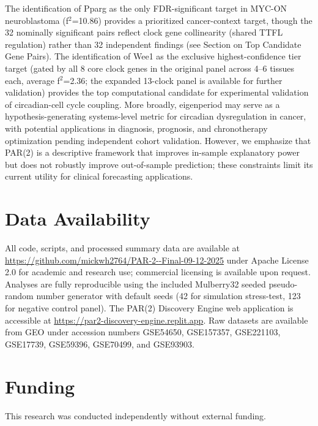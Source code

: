 \documentclass[11pt,a4paper]{article}
\begin{document}
The identification of Pparg as the only FDR-significant target in MYC-ON neuroblastoma (f$^2$=10.86) provides a prioritized cancer-context target, though the 32 nominally significant pairs reflect clock gene collinearity (shared TTFL regulation) rather than 32 independent findings (see Section on Top Candidate Gene Pairs). The identification of Wee1 as the exclusive highest-confidence tier target (gated by all 8 core clock genes in the original panel across 4--6 tissues each, average f$^2$=2.36; the expanded 13-clock panel is available for further validation) provides the top computational candidate for experimental validation of circadian-cell cycle coupling. More broadly, eigenperiod may serve as a hypothesis-generating systems-level metric for circadian dysregulation in cancer, with potential applications in diagnosis, prognosis, and chronotherapy optimization pending independent cohort validation. However, we emphasize that PAR(2) is a descriptive framework that improves in-sample explanatory power but does not robustly improve out-of-sample prediction; these constraints limit its current utility for clinical forecasting applications.

\section*{Data Availability}

All code, scripts, and processed summary data are available at \url{https://github.com/mickwh2764/PAR-2--Final-09-12-2025} under Apache License 2.0 for academic and research use; commercial licensing is available upon request. Analyses are fully reproducible using the included Mulberry32 seeded pseudo-random number generator with default seeds (42 for simulation stress-test, 123 for negative control panel). The PAR(2) Discovery Engine web application is accessible at \url{https://par2-discovery-engine.replit.app}. Raw datasets are available from GEO under accession numbers GSE54650, GSE157357, GSE221103, GSE17739, GSE59396, GSE70499, and GSE93903.

\section*{Funding}

This research was conducted independently without external funding.
\end{document}
